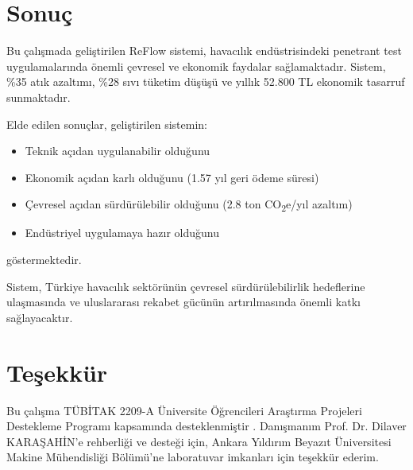 \documentclass[12pt,a4paper]{article}
\begin{document}
\section{Sonuç}

Bu çalışmada geliştirilen ReFlow sistemi, havacılık endüstrisindeki penetrant test uygulamalarında önemli çevresel ve ekonomik faydalar sağlamaktadır. Sistem, \%35 atık azaltımı, \%28 sıvı tüketim düşüşü ve yıllık 52.800 TL ekonomik tasarruf sunmaktadır.

Elde edilen sonuçlar, geliştirilen sistemin:
\begin{itemize}
\item Teknik açıdan uygulanabilir olduğunu
\item Ekonomik açıdan karlı olduğunu (1.57 yıl geri ödeme süresi)
\item Çevresel açıdan sürdürülebilir olduğunu (2.8 ton CO\textsubscript{2}e/yıl azaltım)
\item Endüstriyel uygulamaya hazır olduğunu
\end{itemize}
göstermektedir.

Sistem, Türkiye havacılık sektörünün çevresel sürdürülebilirlik hedeflerine ulaşmasında ve uluslararası rekabet gücünün artırılmasında önemli katkı sağlayacaktır.

\section*{Teşekkür}

Bu çalışma TÜBİTAK 2209-A Üniversite Öğrencileri Araştırma Projeleri Destekleme Programı kapsamında desteklenmiştir \cite{tubitak2019research}. Danışmanım Prof. Dr. Dilaver KARAŞAHİN'e rehberliği ve desteği için, Ankara Yıldırım Beyazıt Üniversitesi Makine Mühendisliği Bölümü'ne laboratuvar imkanları için teşekkür ederim.



\end{document}
